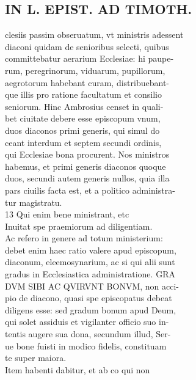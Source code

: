 \documentclass{article}
\begin{document}
\begin{pages}
\section*{IN L. EPIST. AD TIMOTH. \\
                }
clesiis passim obseruatum, vt ministris adessent \\
                diaconi quidam de senioribus selecti, quibus \\
                committebatur aerarium Ecclesiae: hi paupe- \\
                rum, peregrinorum, viduarum, pupillorum, \\
                aegrotorum habebant curam, distribuebant- \\
                que illis pro ratione facultatum et consilio \\
                seniorum. Hinc Ambrosius censet in quali- \\
                bet ciuitate debere esse episcopum vnum, \\
                duos diaconos primi generis, qui simul do \\
                ceant interdum et septem secundi ordinis, \\
                qui Ecclesiae bona procurent. Nos ministros \\
                habemus, et primi generis diaconos quoque \\
                duos, secundi autem generis nullos, quia illa \\
                pars ciuilis facta est, et a politico administra- \\
                tur magistratu. \\
                13 Qui enim bene ministrant, etc \\
                Inuitat spe praemiorum ad diligentiam. \\
                Ac refero in genere ad totum ministerium: \\
                debet enim haec ratio valere apud episcopum, \\
                diaconum, eleemosynarium, ac si qui alii sunt \\
                gradus in Ecclesiastica administratione. GRA \\
                DVM SIBI AC QVIRVNT BONVM, non acci- \\
                pio de diacono, quasi spe episcopatus debeat \\
                diligens esse: sed gradum bonum apud Deum, \\
                qui solet assiduis et vigilanter officio suo in- \\
                tentis augere sua dona, secundum illud, Ser- \\
                ue bone fuisti in modico fidelis, constituam \\
                te super maiora. \\
                Item habenti dabitur, et ab co qui non \\
                

\end{pages}
\end{document}
